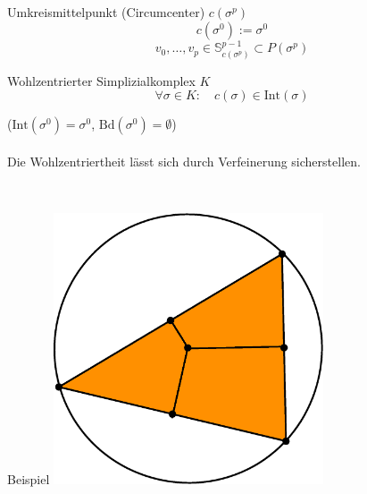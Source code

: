 \documentclass{beamer}
\begin{document}
  \begin{frame}
    \begin{block}{Umkreismittelpunkt (Circumcenter) \( c(\sigma^{p}) \)}
      \[ c(\sigma^{0}) := \sigma^{0} \]
      \[ v_{0},\ldots,v_{p} \in \mathds{S}^{p-1}_{c(\sigma^{p})} \subset P(\sigma^{p}) \]
    \end{block}
    \begin{block}{Wohlzentrierter Simplizialkomplex \( K \)}
    \[ \forall \sigma \in K :\quad c(\sigma) \in \text{Int}(\sigma) \]
    \end{block}

    \begin{minipage}{0.5\textwidth}
      (\( \text{Int}(\sigma^{0}) = \sigma^{0} \), \( \text{Bd}(\sigma^{0}) = \emptyset \))\\\\
      Die Wohlzentriertheit lässt sich durch Verfeinerung sicherstellen.
    \end{minipage} \, 
    \begin{minipage}{0.4\textwidth}
      \begin{block}{Beispiel}
        \centering\includegraphics[width=0.6\textwidth]{bilder/inkscape/subdivision.eps}
      \end{block}
    \end{minipage}
  \end{frame}
\end{document}
